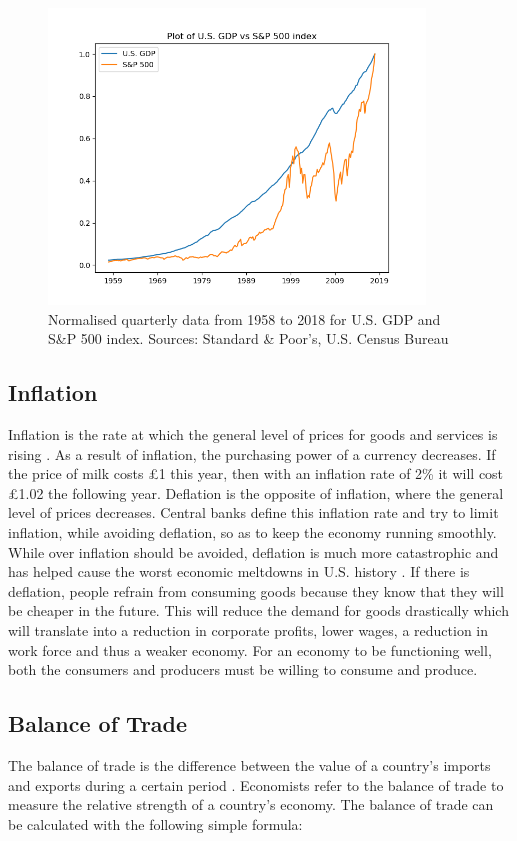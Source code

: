 \documentclass{UoYCSproject}
\begin{document}
\begin{figure}[h]
\includegraphics[width=10cm]{GDPvsSP500}
\centering
\caption{Normalised quarterly data from 1958 to 2018 for U.S. GDP and S\&P 500 index. Sources: Standard \& Poor's, U.S. Census Bureau} 
\label{fig:gdpvssp500}
\end{figure}

\subsection{Inflation}
Inflation is the rate at which the general level of prices for goods and services is rising \cite{inflation}. As a result of inflation, the purchasing power of a currency decreases. If the price of milk costs \pounds 1 this year, then with an inflation rate of 2\% it will cost \pounds 1.02 the following year. Deflation is the opposite of inflation, where the general level of prices decreases. Central banks define this inflation rate and try to limit inflation, while avoiding deflation, so as to keep the economy running smoothly. While over inflation should be avoided, deflation is much more catastrophic and has helped cause the worst economic meltdowns in U.S. history \cite{fleckenstein2013deflation}. If there is deflation, people refrain from consuming goods because they know that they will be cheaper in the future. This will reduce the demand for goods drastically which will translate into a reduction in corporate profits, lower wages, a reduction in work force and thus a weaker economy. For an economy to be functioning well, both the consumers and producers must be willing to consume and produce. 

\subsection{Balance of Trade}
The balance of trade is the difference between the value of a country's imports and exports during a certain period \cite{balanceoftrade}. Economists refer to the balance of trade to measure the relative strength of a country's economy. The balance of trade can be calculated with the following simple formula:
\end{document}
